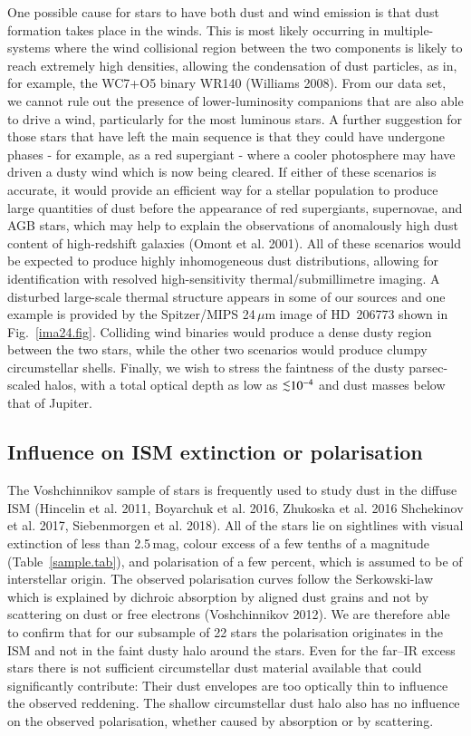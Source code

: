 \documentclass[tradiabstract]{aa} %
\newcommand{\simless}{\mathbin{\lower 3pt\hbox {$\rlap{\raise
        5pt\hbox{$\char'074$}}\mathchar"7218$}}}
\begin{document}
One possible cause for stars to have both dust and wind emission is
that dust formation takes place in the winds. This is most likely
occurring in multiple-systems where the wind collisional region
between the two components is likely to reach extremely high
densities, allowing the condensation of dust particles, as in, for
example, the WC7+O5 binary WR140 (Williams 2008). From our data set,
we cannot rule out the presence of lower-luminosity companions that
are also able to drive a wind, particularly for the most luminous
stars.  A further suggestion for those stars that have left the main
sequence is that they could have undergone phases - for example, as a
red supergiant - where a cooler photosphere may have driven a dusty
wind which is now being cleared.  If either of these scenarios is
accurate, it would provide an efficient way for a stellar population
to produce large quantities of dust before the appearance of red
supergiants, supernovae, and AGB stars, which may help to explain the
observations of anomalously high dust content of high-redshift
galaxies (Omont et al. 2001).  All of these scenarios would be
expected to produce highly inhomogeneous dust distributions, allowing
for identification with resolved high-sensitivity
thermal/submillimetre imaging.  A disturbed large-scale thermal
structure appears in some of our sources and one example is provided
by the Spitzer/MIPS 24\,$\mu$m image of HD~206773 shown in
Fig.~\ref{ima24.fig}. Colliding wind binaries would produce a dense
dusty region between the two stars, while the other two scenarios
would produce clumpy circumstellar shells. Finally, we wish to stress
the faintness of the dusty parsec-scaled halos, with a total optical
depth as low as $\simless 10^{-4}$ and dust masses below that of
Jupiter.



\subsection{Influence on ISM extinction or polarisation}

The Voshchinnikov sample of stars is frequently used to study dust in
the diffuse ISM (Hincelin et al. 2011, Boyarchuk et al. 2016, Zhukoska
et al. 2016 Shchekinov et al. 2017, Siebenmorgen et al. 2018). All of
the stars lie on sightlines with visual extinction of less than
2.5\,mag, colour excess of a few tenths of a magnitude
(Table~\ref{sample.tab}), and polarisation of a few percent, which is
assumed to be of interstellar origin. The observed polarisation curves
follow the Serkowski-law which is explained by dichroic absorption by
aligned dust grains and not by scattering on dust or free electrons
(Voshchinnikov 2012). We are therefore able to confirm that for our
subsample of 22 stars the polarisation originates in the ISM and not
in the faint dusty halo around the stars. Even for the far--IR excess
stars there is not sufficient circumstellar dust material available
that could significantly contribute: Their dust envelopes are too
optically thin to influence the observed reddening. The shallow
circumstellar dust halo also has no influence on the observed
polarisation, whether caused by absorption or by scattering.
\end{document}
